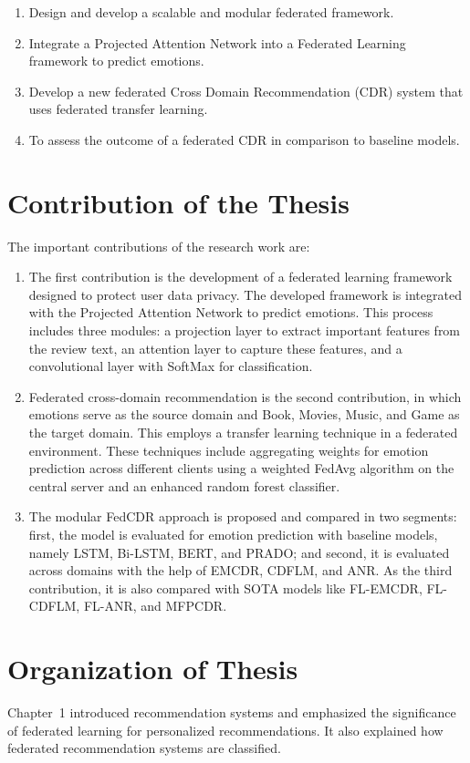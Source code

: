 \begin{enumerate}
\item Design and develop a scalable and modular federated framework.
\item Integrate a Projected Attention Network into a Federated Learning framework to predict emotions.
\item Develop a new federated Cross Domain Recommendation (CDR) system that uses federated transfer learning.
\item To assess the outcome of a federated CDR in comparison to baseline models.
\end{enumerate}

\section{Contribution of the Thesis}
The important contributions of the research work are:

\begin{enumerate}
\item The first contribution is the development of a federated learning framework designed to protect user data privacy. The developed framework is integrated with the Projected Attention Network to predict emotions. This process includes three modules: a projection layer to extract important features from the review text, an attention layer to capture these features, and a convolutional layer with SoftMax for classification.

\item Federated cross-domain recommendation is the second contribution, in which emotions serve as the source domain and Book, Movies, Music, and Game as the target domain. This employs a transfer learning technique in a federated environment. These techniques include aggregating weights for emotion prediction across different clients using a weighted FedAvg algorithm on the central server and an enhanced random forest classifier.

\item The modular FedCDR approach is proposed and compared in two segments: first, the model is evaluated for emotion prediction with baseline models, namely LSTM, Bi-LSTM, BERT, and PRADO; and second, it is evaluated across domains with the help of EMCDR, CDFLM, and ANR. As the third contribution, it is also compared with SOTA models like FL-EMCDR, FL-CDFLM, FL-ANR, and MFPCDR.
\end{enumerate}

\section{Organization of Thesis}
Chapter~1 introduced recommendation systems and emphasized the significance of federated learning for personalized recommendations. It also explained how federated recommendation systems are classified.

